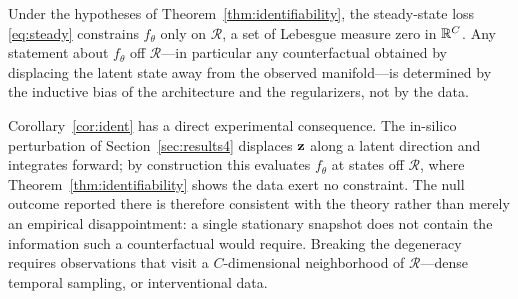 \begin{corollary}
\label{cor:ident}
Under the hypotheses of Theorem~\ref{thm:identifiability}, the steady-state loss
\eqref{eq:steady} constrains $f_\theta$ only on $\mathcal{R}$, a set of Lebesgue
measure zero in $\mathbb{R}^C$. Any statement about $f_\theta$ off $\mathcal{R}$---in
particular any counterfactual obtained by displacing the latent state away from
the observed manifold---is determined by the inductive bias of the architecture
and the regularizers, not by the data.
\end{corollary}

Corollary~\ref{cor:ident} has a direct experimental consequence. The in-silico
perturbation of Section~\ref{sec:results4} displaces $\mathbf{z}$ along a latent
direction and integrates forward; by construction this evaluates $f_\theta$ at
states off $\mathcal{R}$, where Theorem~\ref{thm:identifiability} shows the data
exert no constraint. The null outcome reported there is therefore consistent
with the theory rather than merely an empirical disappointment: a single
stationary snapshot does not contain the information such a counterfactual would
require. Breaking the degeneracy requires observations that visit a
$C$-dimensional neighborhood of $\mathcal{R}$---dense temporal sampling, or
interventional data.

